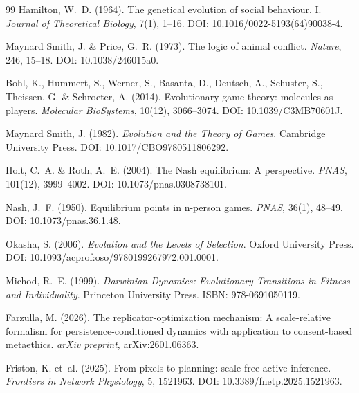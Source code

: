 \documentclass[12pt,a4paper]{article}
\theoremstyle{remark}
\begin{document}
\begin{thebibliography}{99}
Hamilton, W.~D. (1964).
\newblock The genetical evolution of social behaviour. I.
\newblock \textit{Journal of Theoretical Biology}, 7(1), 1--16.
\newblock DOI: 10.1016/0022-5193(64)90038-4.

Maynard Smith, J. \& Price, G.~R. (1973).
\newblock The logic of animal conflict.
\newblock \textit{Nature}, 246, 15--18.
\newblock DOI: 10.1038/246015a0.

Bohl, K., Hummert, S., Werner, S., Basanta, D., Deutsch, A., Schuster, S., Theissen, G. \& Schroeter, A. (2014).
\newblock Evolutionary game theory: molecules as players.
\newblock \textit{Molecular BioSystems}, 10(12), 3066--3074.
\newblock DOI: 10.1039/C3MB70601J.

Maynard Smith, J. (1982).
\newblock \textit{Evolution and the Theory of Games}.
\newblock Cambridge University Press.
\newblock DOI: 10.1017/CBO9780511806292.

Holt, C.~A. \& Roth, A.~E. (2004).
\newblock The Nash equilibrium: A perspective.
\newblock \textit{PNAS}, 101(12), 3999--4002.
\newblock DOI: 10.1073/pnas.0308738101.

Nash, J.~F. (1950).
\newblock Equilibrium points in n-person games.
\newblock \textit{PNAS}, 36(1), 48--49.
\newblock DOI: 10.1073/pnas.36.1.48.

Okasha, S. (2006).
\newblock \textit{Evolution and the Levels of Selection}.
\newblock Oxford University Press.
\newblock DOI: 10.1093/acprof:oso/9780199267972.001.0001.

Michod, R.~E. (1999).
\newblock \textit{Darwinian Dynamics: Evolutionary Transitions in Fitness and Individuality}.
\newblock Princeton University Press. ISBN: 978-0691050119.

Farzulla, M. (2026).
\newblock The replicator-optimization mechanism: A scale-relative formalism for persistence-conditioned dynamics with application to consent-based metaethics.
\newblock \textit{arXiv preprint}, arXiv:2601.06363.

Friston, K. et~al. (2025).
\newblock From pixels to planning: scale-free active inference.
\newblock \textit{Frontiers in Network Physiology}, 5, 1521963.
\newblock DOI: 10.3389/fnetp.2025.1521963.


\end{thebibliography}
\end{document}
